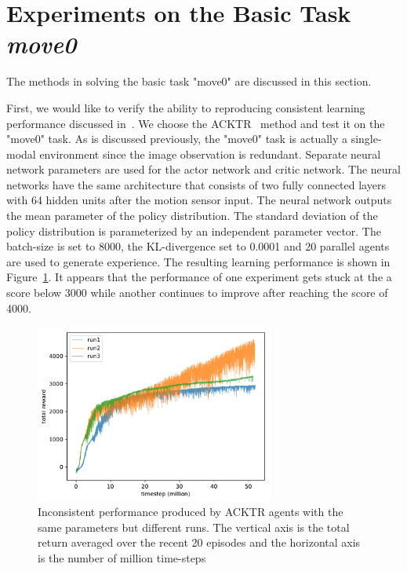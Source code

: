 
\section{Experiments on the Basic Task \textit{move0}}\label{sec_exp_move0}

The methods in solving the basic task "move0" are discussed in this section.

First, we would like to verify the ability to reproducing consistent learning performance discussed in~\cite{henderson2017matters}. We choose the ACKTR~\cite{wu2017scalable} method and test it on the "move0" task. As is discussed previously, the "move0" task is actually a single-modal environment since the image observation is redundant. Separate neural network parameters are used for the actor network and critic network. The neural networks have the same architecture that consists of two fully connected layers with 64 hidden units after the motion sensor input. The neural network outputs the mean parameter of the policy distribution. The standard deviation of the policy distribution is parameterized by an independent parameter vector. The batch-size is set to 8000, the KL-divergence set to 0.0001 and 20 parallel agents are used to generate experience. The resulting learning performance is shown in Figure~\ref{fig_acktr_reprod}. It appears that the performance of one experiment gets stuck at the a score below 3000 while another continues to improve after reaching the score of 4000. 
\begin{figure}[!htbp]
	\includegraphics[width=0.7\textwidth]{images/rec_0403_reprod}
	\centering
	\caption{Inconsistent performance produced by ACKTR agents with the same  parameters but different runs. The vertical axis is the total return averaged over the recent 20 episodes and the horizontal axis is the number of million time-steps}\label{fig_acktr_reprod}
\end{figure}

